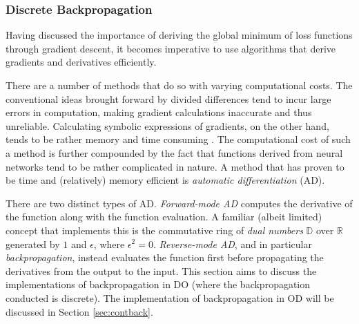 \documentclass[a4paper,11pt,titlepage]{article}
\theoremstyle{definition}
\theoremstyle{plain}
\theoremstyle{remark}
\begin{document}
\subsubsection{Discrete Backpropagation}
\label{sec:ad}

Having discussed the importance of deriving the global minimum of loss functions through gradient descent, it becomes imperative to use algorithms that derive gradients and derivatives efficiently. 

There are a number of methods that do so with varying computational costs. The conventional ideas brought forward by divided differences tend to incur large errors in computation, making gradient calculations inaccurate and thus unreliable. Calculating symbolic expressions of gradients, on the other hand, tends to be rather memory and time consuming \cite{tucker2011}. The computational cost of such a method is further compounded by the fact that functions derived from neural networks tend to be rather complicated in nature. A method that has proven to be time and (relatively) memory efficient is \textit{automatic differentiation} (AD). 

There are two distinct types of AD. \textit{Forward-mode AD} computes the derivative of the function along with the function evaluation. A familiar (albeit limited) concept that implements this is the commutative ring of \textit{dual numbers} $\mathbb{D}$ over $\mathbb{R}$ generated by $1$ and $\epsilon$, where $\epsilon^2 = 0$. \textit{Reverse-mode AD}, and in particular \textit{backpropagation}, instead evaluates the function first before propagating the derivatives from the output to the input. This section aims to discuss the implementations of backpropagation in DO (where the backpropagation conducted is discrete). The implementation of backpropagation in OD will be discussed in Section \ref{sec:contback}.
\end{document}
